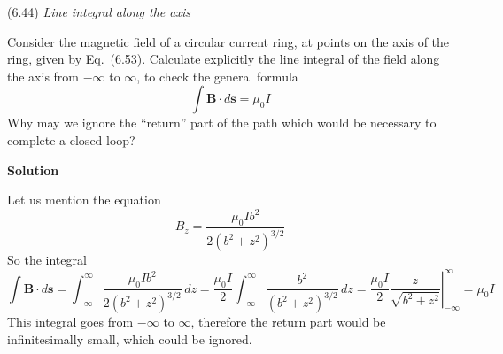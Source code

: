 \documentclass{article}
\begin{document}

\begin{homeworkProblem}
	(6.44) \textit{Line integral along the axis}

	Consider the magnetic field of a circular current ring, at points on the axis of the ring, given by Eq.~(6.53). Calculate explicitly the line integral of the field along the axis from $-\infty$ to $\infty$, to check the general formula
	\begin{equation}\tag{6.97}
		\int\mathbf{B}\cdot d\mathbf{s}=\mu_0I
	\end{equation}
	Why may we ignore the ``return'' part of the path which would be necessary to complete a closed loop?

	\textbf{Solution}

	Let us mention the equation
	\begin{equation}\tag{6.53}
		B_z=\frac{\mu_0Ib^2}{2(b^2+z^2)^{3/2}}
	\end{equation}
	So the integral
	\[
		\int\mathbf{B}\cdot d\mathbf{s}=\int_{-\infty}^{\infty}\frac{\mu_0Ib^2}{2(b^2+z^2)^{3/2}}\,dz=\frac{\mu_0I}{2}\int_{-\infty}^{\infty}\frac{b^2}{(b^2+z^2)^{3/2}}\,dz=\left.\frac{\mu_0I}{2}\frac{z}{\sqrt{b^2+z^2}}\right|_{-\infty}^{\infty}=\mu_0I
	\]
	This integral goes from $-\infty$ to $\infty$, therefore the return part would be infinitesimally small, which could be ignored.
\end{homeworkProblem}

\end{document}
